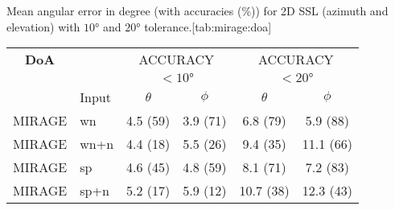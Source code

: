 \begin{table}[ht]
\begin{sidecaption}{%
    Mean angular error in degree (with accuracies ($\%$)) for 2D SSL (azimuth and elevation)
    with $\ang{10}$ and $\ang{20}$ tolerance.}[tab:mirage:doa]
    \footnotesize
    \centering
    \begin{tabular}{cl|cc|cc}
    \toprule
    \textbf{DoA}    &            &  \multicolumn{2}{c|}{ACCURACY}    &   \multicolumn{2}{c}{ACCURACY} \\
                    &            &  \multicolumn{2}{c|}{$<\ang{10}$} &   \multicolumn{2}{c}{$<\ang{20}$} \\
                    &    Input   &  $\theta$ &  $\phi$ &  $\theta$ &  $\phi$ \\
    \midrule
    MIRAGE &  wn    &   4.5 (59) &  3.9 (71) &   6.8 (79) &   5.9 (88) \\
    MIRAGE &  wn+n  &   4.4 (18) &  5.5 (26) &   9.4 (35) &  11.1 (66) \\
    MIRAGE &  sp    &   4.6 (45) &  4.8 (59) &   8.1 (71) &   7.2 (83) \\
    MIRAGE &  sp+n  &   5.2 (17) &  5.9 (12) &  10.7 (38) &  12.3 (43) \\
    \bottomrule
    \end{tabular}
\end{sidecaption}
\end{table}


